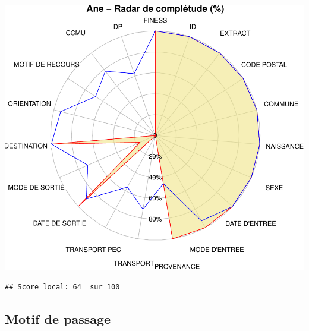 \documentclass[]{article}
\begin{document}
\includegraphics{completude_files/figure-latex/finess-15.pdf}

\begin{verbatim}
## Score local: 64  sur 100
\end{verbatim}

\subsection{Motif de passage}\label{motif-de-passage}
\end{document}
